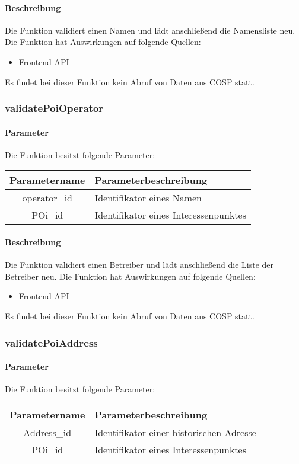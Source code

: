 \paragraph{Beschreibung} Die Funktion validiert einen Namen und lädt anschließend die Namensliste neu. Die Funktion hat Auswirkungen auf folgende Quellen:
\begin{itemize}
	\item Frontend-API
\end{itemize}
Es findet bei dieser Funktion kein Abruf von Daten aus {\glqq COSP\grqq} statt.
\subsubsection{validatePoiOperator}
\paragraph{Parameter} Die Funktion besitzt folgende Parameter:
\begin{table}[H]
	\begin{tabular}{|c|p{11cm}|}
		\hline
		\textbf{Parametername} & \textbf{Parameterbeschreibung} \\ \hline
		operator\_id & Identifikator eines Namen \\ \hline
		POi\_id      & Identifikator eines Interessenpunktes \\ \hline
	\end{tabular}
\end{table}
\paragraph{Beschreibung} Die Funktion validiert einen Betreiber und lädt anschließend die Liste der Betreiber neu. Die Funktion hat Auswirkungen auf folgende Quellen:
\begin{itemize}
	\item Frontend-API
\end{itemize}
Es findet bei dieser Funktion kein Abruf von Daten aus {\glqq COSP\grqq} statt.
\subsubsection{validatePoiAddress}
\paragraph{Parameter} Die Funktion besitzt folgende Parameter:
\begin{table}[H]
	\begin{tabular}{|c|p{11cm}|}
		\hline
		\textbf{Parametername} & \textbf{Parameterbeschreibung} \\ \hline
		Address\_id & Identifikator einer historischen Adresse \\ \hline
		POi\_id     & Identifikator eines Interessenpunktes \\ \hline
	\end{tabular}
\end{table}
